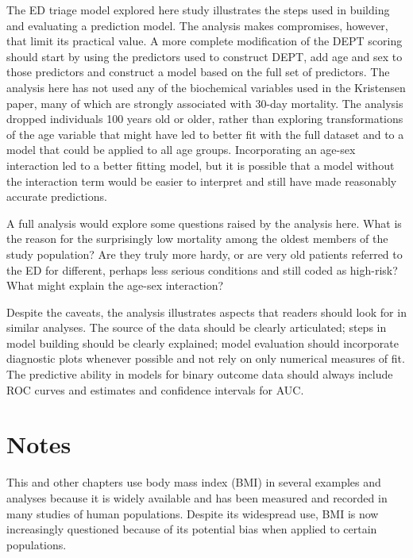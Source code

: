 The ED triage model explored here study illustrates the steps used in building and evaluating a prediction model.   The analysis makes compromises, however, that limit its practical value.  A more complete modification of the DEPT scoring should start by using the predictors used to construct DEPT, add age and sex to those predictors and construct a model based on the full set of predictors.   The analysis here has not used any of the biochemical variables used in the Kristensen paper, many of which are strongly associated with 30-day mortality. The analysis dropped individuals 100 years old or older, rather than exploring transformations of the age variable that might have led to  better fit with the full dataset and to a model that could be applied to all age groups.  Incorporating an age-sex interaction led to a better fitting model, but it is possible that a model without the interaction term would be easier to interpret and still have made reasonably accurate predictions. 

A full analysis would explore some questions raised by the analysis here.  What is the reason for the surprisingly low mortality among the oldest members of the study population? Are they truly more hardy, or are very old patients referred to the ED for different, perhaps less serious conditions and still coded as high-risk?  What might explain the age-sex interaction? 

Despite the caveats, the analysis illustrates aspects that readers should look for in similar analyses. The source of the data should be clearly articulated; steps in model building should be clearly explained; model evaluation should incorporate diagnostic plots whenever  possible and not rely on only numerical  measures of fit.  The predictive ability in models for binary outcome data should always include ROC curves and estimates and confidence intervals for AUC.


\textD{\newpage}

\section{Notes}
\label{notesLogisticRegression}

This and other chapters use body mass index (BMI) in several examples and analyses because it is widely available and has been measured and recorded in many studies of human populations. Despite its widespread use, BMI is now increasingly questioned because of its potential bias when applied to certain populations.

